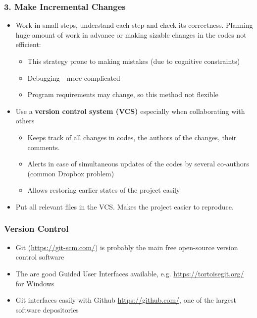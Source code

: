 \documentclass{beamer}
\newcommand{\highlight}[1]{{\color{blue}{#1}}}
\renewcommand{\highlight}[1]{{\textbf{#1}}}
\begin{document}
\begin{frame}
\frametitle{3. Make Incremental Changes}
\begin{itemize}
\item Work in small steps, understand each step and check its correctness. Planning huge amount of work in advance or making sizable changes in the codes not efficient:
\begin{itemize}
\item This strategy prone to making mistakes (due to cognitive constraints)
\item Debugging - more complicated
\item Program requirements may change, so this method not flexible
\end{itemize}
\item Use a \highlight{version control system (VCS)} especially when collaborating with others
 \begin{itemize}
   \item Keeps track of all changes in codes, the authors of the changes, their comments.
   \item Alerts in case of simultaneous updates of the codes by several co-authors (common Dropbox problem)
   \item Allows restoring earlier states of the project easily
 \end{itemize}
\item Put all relevant files in the VCS. Makes the project easier to reproduce.
\end{itemize}
\end{frame}

\begin{frame}
\frametitle{Version Control}
\begin{itemize}
\item Git (\url{https://git-scm.com/}) is probably the main free open-source version control software
\item The are good Guided User Interfaces available, e.g. \url{https://tortoisegit.org/} for Windows
\item Git interfaces easily with Github \url{https://github.com/}, one of the largest software depositories
\end{itemize}
\end{frame}
\end{document}
